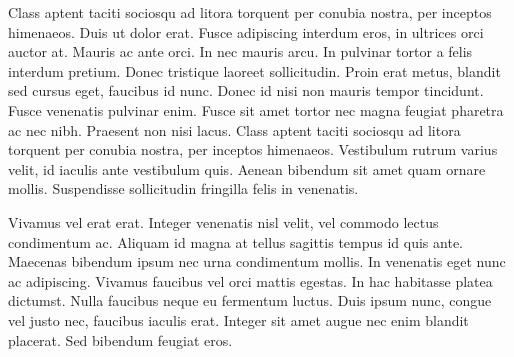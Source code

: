 \documentclass[doutorado,rascunho]{fei}
\begin{document}
\begin{resumo}
Class aptent taciti sociosqu ad litora torquent per conubia nostra, per inceptos himenaeos. Duis ut dolor erat. Fusce adipiscing interdum eros, in ultrices orci auctor at. Mauris ac ante orci. In nec mauris arcu. In pulvinar tortor a felis interdum pretium. Donec tristique laoreet sollicitudin. Proin erat metus, blandit sed cursus eget, faucibus id nunc. Donec id nisi non mauris tempor tincidunt. Fusce venenatis pulvinar enim. Fusce sit amet tortor nec magna feugiat pharetra ac nec nibh. Praesent non nisi lacus. Class aptent taciti sociosqu ad litora torquent per conubia nostra, per inceptos himenaeos. Vestibulum rutrum varius velit, id iaculis ante vestibulum quis. Aenean bibendum sit amet quam ornare mollis. Suspendisse sollicitudin fringilla felis in venenatis.

Vivamus vel erat erat. Integer venenatis nisl velit, vel commodo lectus condimentum ac. Aliquam id magna at tellus sagittis tempus id quis ante. Maecenas bibendum ipsum nec urna condimentum mollis. In venenatis eget nunc ac adipiscing. Vivamus faucibus vel orci mattis egestas. In hac habitasse platea dictumst. Nulla faucibus neque eu fermentum luctus. Duis ipsum nunc, congue vel justo nec, faucibus iaculis erat. Integer sit amet augue nec enim blandit placerat. Sed bibendum feugiat eros.
\end{resumo}
\end{document}

